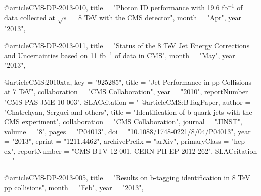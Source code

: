 \clearpage

\vspace*{-0.2cm}

 

@article{CMS-DP-2013-010,
      title        = "Photon ID performance with 19.6 fb$^{-1}$ of data collected
                      at $\sqrt{s}$ = 8 TeV with the CMS detector",
      month        = "Apr",
      year         = "2013",
}

@article{CMS-DP-2013-011,
      title        = "Status of the 8 TeV Jet Energy Corrections and
                      Uncertainties based on 11 fb$^{-1}$ of data in CMS",
      month        = "May",
      year         = "2013",
}

@article{CMS:2010xta,
      key            = "925285",
      title          = "{Jet Performance in pp Collisions at 7 TeV}",
      collaboration  = "CMS Collaboration",
      year           = "2010",
      reportNumber   = "CMS-PAS-JME-10-003",
      SLACcitation   = "%
}
@article{CMS:BTagPaper,
      author         = "Chatrchyan, Serguei and others",
      title          = "{Identification of b-quark jets with the CMS experiment}",
      collaboration  = "CMS Collaboration",
      journal        = "JINST",
      volume         = "8",
      pages          = "P04013",
      doi            = "10.1088/1748-0221/8/04/P04013",
      year           = "2013",
      eprint         = "1211.4462",
      archivePrefix  = "arXiv",
      primaryClass   = "hep-ex",
      reportNumber   = "CMS-BTV-12-001, CERN-PH-EP-2012-262",
      SLACcitation   = "%
}

@article{CMS-DP-2013-005,
      title        = "Results on b-tagging identification in 8 TeV pp collisions",
      month        = "Feb",
      year         = "2013",
}